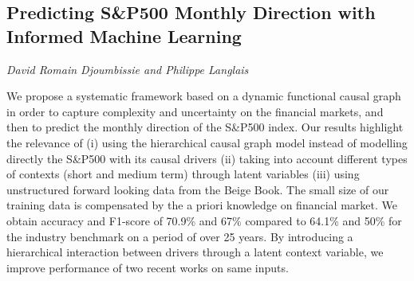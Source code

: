 \documentclass[../booklet.tex]{subfiles}
\begin{document}
\subsection[Predicting S\&P500 Monthly Direction with Informed Machine Learning. {\it David Romain Djoumbissie and Philippe Langlais}]{Predicting S\&P500 Monthly Direction with Informed Machine Learning}
 

\begin{center}
  {\it David Romain Djoumbissie and Philippe Langlais}
\end{center}

\vskip 0.8cm


We propose a systematic framework based on a dynamic functional causal graph in order to capture complexity and uncertainty on the financial markets, and then to predict the monthly direction of the S\&P500 index. Our results highlight the relevance of (i) using the hierarchical causal graph model instead of modelling directly the S\&P500 with its causal drivers (ii) taking into account different types of contexts (short and medium term) through latent variables (iii) using unstructured forward looking data from the Beige Book. The small size of our training data is compensated by the a priori knowledge on financial market. We obtain accuracy and F1-score of 70.9\% and 67\% compared to 64.1\% and 50\% for the industry benchmark on a period of over 25 years. By introducing a hierarchical interaction between drivers through a latent context variable, we improve performance of two recent works on same inputs.\\ 

\end{document}
